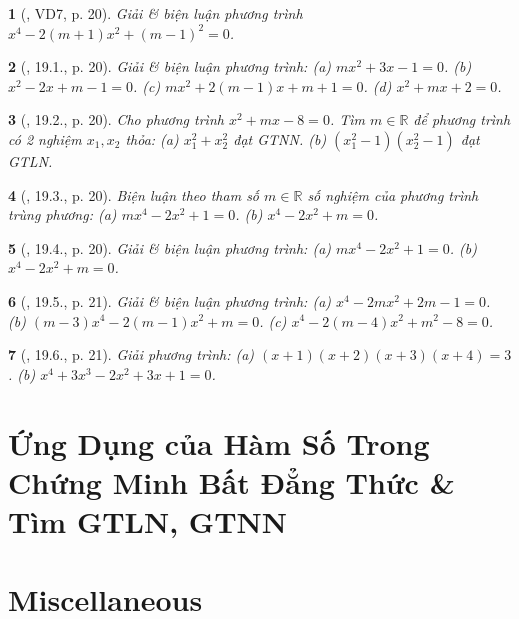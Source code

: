 \documentclass{article}
\newtheorem{baitoan}{}
\begin{document}
\begin{baitoan}[\cite{Hai_Hung_Thu_Tung_ncpt_Toan_10_tap_2}, VD7, p. 20]
	Giải \& biện luận phương trình $x^4 - 2(m + 1)x^2 + (m - 1)^2 = 0$.
\end{baitoan}

\begin{baitoan}[\cite{Hai_Hung_Thu_Tung_ncpt_Toan_10_tap_2}, 19.1., p. 20]
	Giải \& biện luận phương trình: (a) $mx^2 + 3x - 1 = 0$. (b) $x^2 - 2x + m - 1 = 0$. (c) $mx^2 + 2(m - 1)x + m + 1 = 0$. (d) $x^2 + mx + 2 = 0$.
\end{baitoan}

\begin{baitoan}[\cite{Hai_Hung_Thu_Tung_ncpt_Toan_10_tap_2}, 19.2., p. 20]
	Cho phương trình $x^2 + mx - 8 = 0$. Tìm $m\in\mathbb{R}$ để phương trình có 2 nghiệm $x_1,x_2$ thỏa: (a) $x_1^2 + x_2^2$ đạt {\rm GTNN}. (b) $(x_1^2 - 1)(x_2^2 - 1)$ đạt {\rm GTLN}.
\end{baitoan}

\begin{baitoan}[\cite{Hai_Hung_Thu_Tung_ncpt_Toan_10_tap_2}, 19.3., p. 20]
	Biện luận theo tham số $m\in\mathbb{R}$ số nghiệm của phương trình trùng phương: (a) $mx^4 - 2x^2 + 1 = 0$. (b) $x^4 - 2x^2 + m = 0$.
\end{baitoan}

\begin{baitoan}[\cite{Hai_Hung_Thu_Tung_ncpt_Toan_10_tap_2}, 19.4., p. 20]
	Giải \& biện luận phương trình: (a) $mx^4 - 2x^2 + 1 = 0$. (b) $x^4 - 2x^2 + m = 0$.
\end{baitoan}

\begin{baitoan}[\cite{Hai_Hung_Thu_Tung_ncpt_Toan_10_tap_2}, 19.5., p. 21]
	Giải \& biện luận phương trình: (a) $x^4 - 2mx^2 + 2m - 1 = 0$. (b) $(m - 3)x^4 - 2(m - 1)x^2 + m = 0$. (c) $x^4 - 2(m - 4)x^2 + m^2 - 8 = 0$.
\end{baitoan}

\begin{baitoan}[\cite{Hai_Hung_Thu_Tung_ncpt_Toan_10_tap_2}, 19.6., p. 21]
	Giải phương trình: (a) $(x + 1)(x + 2)(x + 3)(x + 4) = 3$. (b) $x^4 + 3x^3 - 2x^2 + 3x + 1 = 0$.
\end{baitoan}


\section{Ứng Dụng của Hàm Số Trong Chứng Minh Bất Đẳng Thức \& Tìm GTLN, GTNN}


\section{Miscellaneous}


\printbibliography[heading=bibintoc]
	
\end{document}
